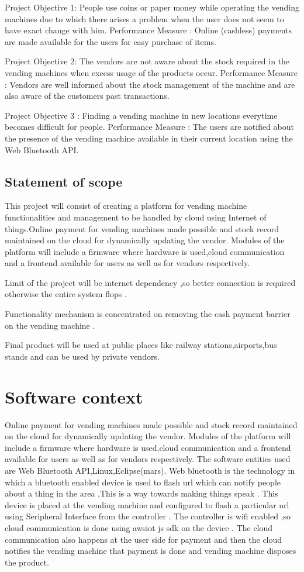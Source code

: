 \documentclass[oneside,a4paper,12pt]{report}
\begin{document}
Project Objective 1:
People use coins or paper money while operating the vending machines due to which there arises a problem when the user does not seem to have exact change with him.
Performance Measure :
Online (cashless) payments are made available for the users for easy purchase of items.

Project Objective 2:
The vendors are not aware about the stock required in the vending machines when excess usage of the products occur.
Performance Measure :
Vendors are well informed about the stock management of the machine and are also aware of the customers past transactions.

Project Objective 3 :
Finding a vending machine in new locations everytime becomes difficult for people.
Performance Measure :
The users are notified about the presence of the vending machine available in their current location using the Web Bluetooth API.
	
 \subsection{Statement of scope} 
This project will consist of creating a platform for vending machine functionalities and management to be  handled by cloud using Internet of things.Online payment for vending machines made possible and stock record maintained on the cloud for dynamically updating the vendor. Modules of the platform will include a firmware where hardware is used,cloud communication and a frontend available for users as well as for vendors respectively.

Limit of the project will be internet dependency ,so better connection is required otherwise the entire system flops .


Functionality mechanism is concentrated on removing the cash payment barrier on the vending machine .

Final product will be used at public places like railway stations,airports,bus stands and can be used by private vendors.
\section{Software context} 
Online payment for vending machines made possible and stock record maintained on the cloud for dynamically updating the vendor. Modules of the platform will include a firmware where hardware is used,cloud communication and a frontend available for users as well as for vendors respectively.
The software entities used are Web Bluetooth API,Linux,Eclipse(mars).
Web bluetooth is the technology in which a bluetooth enabled device is used to flash url which can notify people about a thing in the area ,This is a way towards making things speak .
This device is placed at the vending machine and configured to flash a particular url using Seripheral Interface from the controller .
The controller is wifi enabled ,so cloud communication is done using awsiot js sdk on the device .
The cloud communication also happens at the user side for  payment and then the cloud notifies the vending machine that payment is done and vending machine disposes the product.
\end{document}
